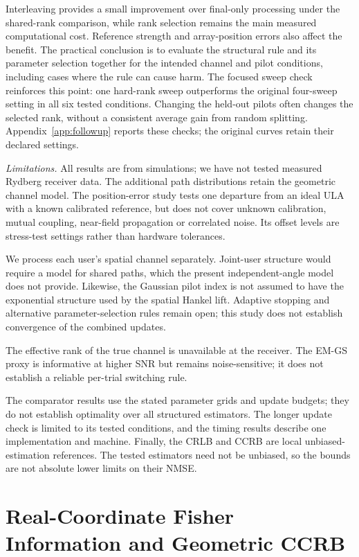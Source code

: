 \documentclass[journal]{IEEEtran}
\begin{document}
Interleaving provides a small improvement over final-only processing under
the shared-rank comparison, while rank selection remains the main measured
computational cost. Reference strength and array-position errors also affect
the benefit. The practical conclusion is to evaluate the structural rule
and its parameter selection together for the intended channel and pilot
conditions, including cases where the rule can cause harm.
The focused sweep check reinforces this point: one hard-rank sweep
outperforms the original four-sweep setting in all six tested conditions.
Changing the held-out pilots often changes the selected rank, without a
consistent average gain from random splitting. Appendix~\ref{app:followup}
reports these checks; the original curves retain their declared settings.

\textit{Limitations.} All results are from simulations; we have not tested
measured Rydberg receiver data. The additional path distributions retain
the geometric channel model. The position-error study tests one departure
from an ideal ULA with a known calibrated reference, but does not cover
unknown calibration, mutual coupling, near-field propagation or correlated
noise. Its offset levels are stress-test settings rather than hardware
tolerances.

We process each user's spatial channel separately. Joint-user structure
would require a model for shared paths, which the present independent-angle
model does not provide. Likewise, the Gaussian pilot index is not assumed
to have the exponential structure used by the spatial Hankel lift.
Adaptive stopping and alternative parameter-selection rules remain open;
this study does not establish convergence of the combined updates.

The effective rank of the true channel is unavailable at the receiver.
The EM-GS proxy is informative at higher SNR but remains noise-sensitive;
it does not establish a reliable per-trial switching rule.

The comparator results use the stated parameter grids and update budgets;
they do not establish optimality over all structured estimators. The longer
update check is limited to its tested conditions, and the timing results
describe one implementation and machine. Finally, the CRLB and CCRB are
local unbiased-estimation references. The tested estimators need not be
unbiased, so the bounds are not absolute lower limits on their NMSE.

\appendices
\section{Real-Coordinate Fisher Information and Geometric CCRB}
\label{app:revision-ccrb}
\end{document}
